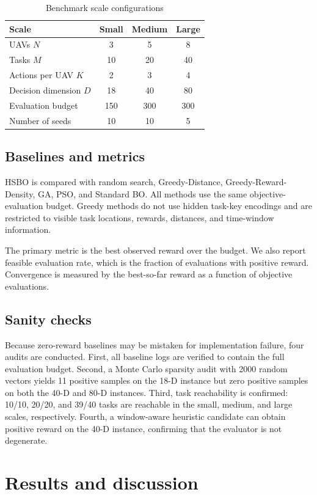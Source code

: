 \documentclass[twocolumn]{article}
\begin{document}
\begin{table}[t]
\centering
\caption{Benchmark scale configurations}
\label{tab:scales}
\begin{tabular}{lccc}
\toprule
Scale & Small & Medium & Large \\
\midrule
UAVs $N$ & 3 & 5 & 8 \\
Tasks $M$ & 10 & 20 & 40 \\
Actions per UAV $K$ & 2 & 3 & 4 \\
Decision dimension $D$ & 18 & 40 & 80 \\
Evaluation budget & 150 & 300 & 300 \\
Number of seeds & 10 & 10 & 5 \\
\bottomrule
\end{tabular}
\end{table}

\subsection{Baselines and metrics}
HSBO is compared with random search, Greedy-Distance, Greedy-Reward-Density, GA, PSO, and Standard BO. All methods use the same objective-evaluation budget. Greedy methods do not use hidden task-key encodings and are restricted to visible task locations, rewards, distances, and time-window information.

The primary metric is the best observed reward over the budget. We also report feasible evaluation rate, which is the fraction of evaluations with positive reward. Convergence is measured by the best-so-far reward as a function of objective evaluations.

\subsection{Sanity checks}
Because zero-reward baselines may be mistaken for implementation failure, four audits are conducted. First, all baseline logs are verified to contain the full evaluation budget. Second, a Monte Carlo sparsity audit with 2000 random vectors yields 11 positive samples on the 18-D instance but zero positive samples on both the 40-D and 80-D instances. Third, task reachability is confirmed: 10/10, 20/20, and 39/40 tasks are reachable in the small, medium, and large scales, respectively. Fourth, a window-aware heuristic candidate can obtain positive reward on the 40-D instance, confirming that the evaluator is not degenerate.

\section{Results and discussion}
\end{document}
